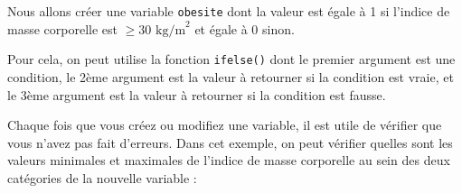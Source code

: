 \documentclass[
]{book}
\newenvironment{Shaded}{\begin{snugshade}}{\end{snugshade}}
\newcommand{\CommentTok}[1]{\textcolor[rgb]{0.56,0.35,0.01}{\textit{#1}}}
\newcommand{\DecValTok}[1]{\textcolor[rgb]{0.00,0.00,0.81}{#1}}
\newcommand{\DocumentationTok}[1]{\textcolor[rgb]{0.56,0.35,0.01}{\textbf{\textit{#1}}}}
\newcommand{\FunctionTok}[1]{\textcolor[rgb]{0.13,0.29,0.53}{\textbf{#1}}}
\newcommand{\NormalTok}[1]{#1}
\newcommand{\OtherTok}[1]{\textcolor[rgb]{0.56,0.35,0.01}{#1}}
\newcommand{\SpecialCharTok}[1]{\textcolor[rgb]{0.81,0.36,0.00}{\textbf{#1}}}
\begin{document}
Nous allons créer une variable \texttt{obesite} dont la valeur est égale à 1 si l'indice de masse corporelle est \(\geq 30\text{ kg/m}^2\) et égale à 0 sinon.

Pour cela, on peut utilise la fonction \texttt{ifelse()} dont le premier argument est une condition, le 2ème argument est la valeur à retourner si la condition est vraie, et le 3ème argument est la valeur à retourner si la condition est fausse.

\begin{Shaded}
\end{Shaded}

Chaque fois que vous créez ou modifiez une variable, il est utile de vérifier que vous n'avez pas fait d'erreurs. Dans cet exemple, on peut vérifier quelles sont les valeurs minimales et maximales de l'indice de masse corporelle au sein des deux catégories de la nouvelle variable :

\begin{Shaded}
\end{Shaded}
\end{document}
